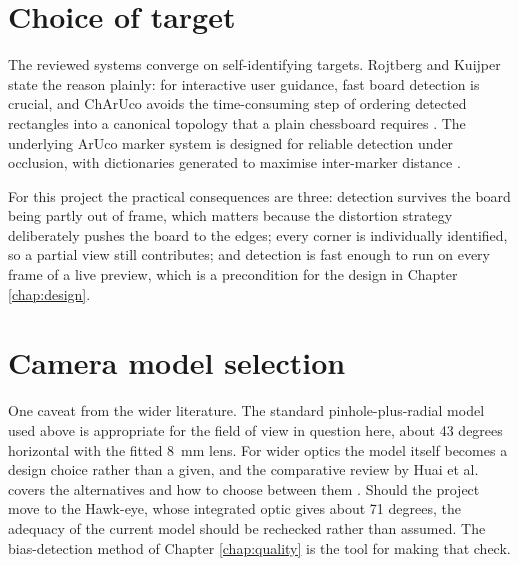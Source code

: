 \section{Choice of target}

The reviewed systems converge on self-identifying targets. Rojtberg and Kuijper state the reason plainly: for interactive user guidance, fast board detection is crucial, and ChArUco avoids the time-consuming step of ordering detected rectangles into a canonical topology that a plain chessboard requires \cite{rojtberg2018pose}. The underlying ArUco marker system is designed for reliable detection under occlusion, with dictionaries generated to maximise inter-marker distance \cite{garrido2014aruco}.

For this project the practical consequences are three: detection survives the board being partly out of frame, which matters because the distortion strategy deliberately pushes the board to the edges; every corner is individually identified, so a partial view still contributes; and detection is fast enough to run on every frame of a live preview, which is a precondition for the design in Chapter \ref{chap:design}.

\section{Camera model selection}

One caveat from the wider literature. The standard pinhole-plus-radial model used above is appropriate for the field of view in question here, about 43 degrees horizontal with the fitted 8~mm lens. For wider optics the model itself becomes a design choice rather than a given, and the comparative review by Huai et al. covers the alternatives and how to choose between them \cite{huai2023wideangle}. Should the project move to the Hawk-eye, whose integrated optic gives about 71 degrees, the adequacy of the current model should be rechecked rather than assumed. The bias-detection method of Chapter \ref{chap:quality} is the tool for making that check.
